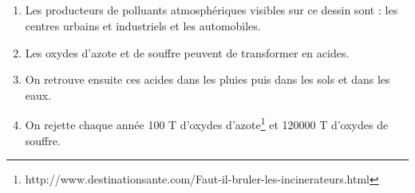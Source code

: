 \documentclass[12pt,a4paper]{article}
\begin{document}
\subsection*{}
\begin{enumerate}[label=\alph*)]
	\item Les producteurs de polluants atmosphériques visibles sur ce dessin sont : les centres urbains et industriels et les automobiles.
	\item Les oxydes d'azote et de souffre peuvent de transformer en acides.
	\item On retrouve ensuite ces acides dans les pluies puis dans les sols et dans les eaux.
	\item On rejette chaque année 100 T d'oxydes d'azote\footnote{http://www.destinationsante.com/Faut-il-bruler-les-incinerateurs.html} et \num{120 000} T d'oxydes de souffre. 
\end{enumerate}
\end{document}

